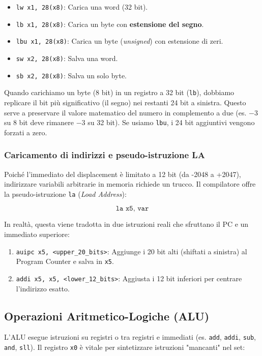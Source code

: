 \begin{itemize}
    \item \texttt{lw x1, 28(x8)}: Carica una word (32 bit).
    \item \texttt{lb x1, 28(x8)}: Carica un byte con \textbf{estensione del segno}.
    \item \texttt{lbu x1, 28(x8)}: Carica un byte (\textit{unsigned}) con estensione di zeri.
    \item \texttt{sw x2, 28(x8)}: Salva una word.
    \item \texttt{sb x2, 28(x8)}: Salva un solo byte.
\end{itemize}

\begin{remark}
Quando carichiamo un byte (8 bit) in un registro a 32 bit (\texttt{lb}), dobbiamo replicare il bit più significativo (il segno) nei restanti 24 bit a sinistra. Questo serve a preservare il valore matematico del numero in complemento a due (es. \(-3\) su 8 bit deve rimanere \(-3\) su 32 bit). Se usiamo \texttt{lbu}, i 24 bit aggiuntivi vengono forzati a zero.
\end{remark}

\subsubsection{Caricamento di indirizzi e pseudo-istruzione LA}
Poiché l'immediato del displacement è limitato a 12 bit (da -2048 a +2047), indirizzare variabili arbitrarie in memoria richiede un trucco. Il compilatore offre la pseudo-istruzione \texttt{la} (\textit{Load Address}):

\[ \texttt{la x5, var} \]

In realtà, questa viene tradotta in due istruzioni reali che sfruttano il PC e un immediato superiore:
\begin{enumerate}
    \item \texttt{auipc x5, <upper\_20\_bits>}: Aggiunge i 20 bit alti (shiftati a sinistra) al Program Counter e salva in \texttt{x5}.
    \item \texttt{addi x5, x5, <lower\_12\_bits>}: Aggiusta i 12 bit inferiori per centrare l'indirizzo esatto.
\end{enumerate}

\subsection{Operazioni Aritmetico-Logiche (ALU)}
L'ALU esegue istruzioni su registri o tra registri e immediati (es. \texttt{add}, \texttt{addi}, \texttt{sub}, \texttt{and}, \texttt{sll}).
Il registro \texttt{x0} è vitale per sintetizzare istruzioni "mancanti" nel set:


